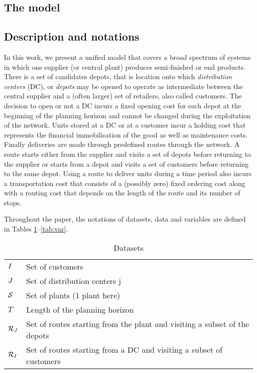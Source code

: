 \documentclass[a4paper,10pt]{article}
\begin{document}
\begin{linenumbers}
\newpage

\section{The model}

\label{sec:model}

\subsection{Description and notations}
In this work, we present a unified model that covers a broad spectrum of systems in which one supplier (or central plant) produces semi-finished or end products. 
There is a set of candidates depots, that is location onto which {\em distribution centers} (DC), or {\em depots} may be opened to operate as intermediate between the central supplier and a (often larger) set of retailers, also called customers.
The decision to open or not a DC incurs a fixed opening cost for each depot at the beginning of the planning horizon and cannot be changed during the exploitation of the network.
Units stored at a DC or at a customer incur a holding cost that represents the financial immobilisation of the good as well as maintenance costs.
Finally deliveries are made through predefined routes through the network. A route starts either from the supplier and visits a set of depots before returning to the supplier or starts from a depot and visits a set of customers before returning to the same depot. 
Using a route to deliver units during a time period also incurs a transportation cost that consists of a (possibly zero) fixed ordering cost along with a routing cost that depends on the length of the route and its number of stops.

Throughout the paper, the notations of datasets, data and variables are defined in Tables \ref{tab:set}--\ref{tab:var}. 
\begin{table} 
    \centering
    \begin{tabular}{ll}
        \toprule
        $I$ & Set of customers \\ 
        $J$ & Set of distribution centers j \\
        $\mathcal{S}$ & Set of plants (1 plant here)\\
        $T$ & Length of the planning horizon\\
        $\mathcal{R}_J$ & Set of routes starting from the plant and visiting a subset of the depots\\
        $\mathcal{R}_I$ & Set of routes starting from a DC and visiting a subset of customers\\
        \bottomrule
    \end{tabular}
 \caption{Datasets}
   \label{tab:set}
\end{table}


\end{linenumbers}
\end{document}
